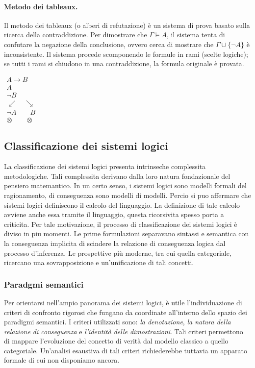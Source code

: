 \paragraph{Metodo dei tableaux.}
Il metodo dei tableaux (o alberi di refutazione) è un sistema di prova basato sulla ricerca della contraddizione. Per dimostrare che $\Gamma \models A$, il sistema tenta di confutare la negazione della conclusione, 
ovvero cerca di mostrare che $\Gamma \cup \{\neg A\}$ è inconsistente. Il sistema procede scomponendo le formule in rami (scelte logiche); se tutti i rami si chiudono in una contraddizione, la formula originale è provata. 
\begin{center}
    $\begin{array}{c}
        A \to B                     \\
        A                           \\
        \neg B                      \\
        \hline
        \swarrow \quad \searrow     \\
        \neg A \quad\quad B         \\
        \otimes \quad\quad \otimes
    \end{array}$
\end{center}

\subsection{Classificazione dei sistemi logici}
La classificazione dei sistemi logici presenta intrinseche complessita metodologiche. Tali complessita derivano dalla loro natura fondazionale del pensiero matemantico. In un certo senso,
i sistemi logici sono modelli formali del ragionamento, di conseguenza sono modelli di modelli. Percio si puo affermare che sistemi logici definiscono il calcolo del linguaggio. La definizione
di tale calcolo avviene anche essa tramite il linguaggio, questa ricorsivita spesso porta a criticita. Per tale motivazione, il processo di classificazione dei sistemi logici è diviso in piu 
momenti. Le prime formulazioni separavano sintassi e semantica con la conseguenza implicita di scindere la relazione di conseguenza logica dal processo d'inferenza. Le prospettive più moderne, 
tra cui quella categoriale, ricercano una sovrapposizione e un'unificazione di tali concetti.

\subsubsection{Paradgmi semantici}
Per orientarsi nell'ampio panorama dei sistemi logici, è utile l'individuazione di criteri di confronto rigorosi che fungano da coordinate all'interno dello spazio dei paradigmi semantici.
I criteri utilizzati sono: \emph{la denotazione}, \emph{la natura della relazione di conseguenza} e \emph{l'identità delle dimostrazioni}. Tali criteri permettono di mappare l'evoluzione del 
concetto di verità dal modello classico a quello categoriale. Un'analisi esaustiva di tali criteri richiederebbe tuttavia un apparato formale di cui non disponiamo ancora. 

